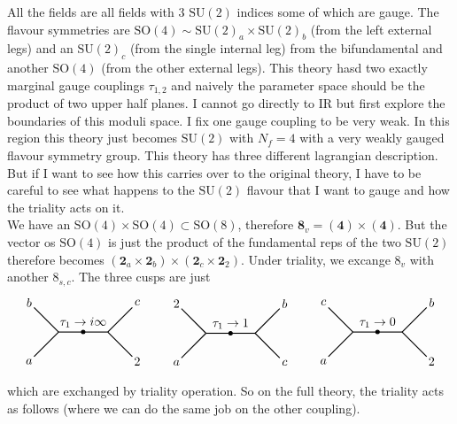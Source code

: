 \documentclass[11pt]{article}
\theoremstyle{definition}
\numberwithin{equation}{section}
\newcommand*\SU{\mathrm{SU}}
\newcommand*\SO{\mathrm{SO}}
\begin{document}
All the fields are all fields with $3$ $\SU(2)$ indices some of which are gauge. The flavour symmetries are $\SO(4)\sim\SU(2)_{a}\times\SU(2)_{b}$ (from the left external legs) and an $\SU(2)_{c}$ (from the single internal leg) from the bifundamental and another $\SO(4)$ (from the other external legs). This theory hasd two exactly marginal gauge couplings $\tau_{1,2}$ and naively the parameter space should be the product of two upper half planes. I cannot go directly to IR but first explore the boundaries of this moduli space. I fix one gauge coupling to be very weak. In this region this theory just becomes $\SU(2)$ with $N_{f}=4$ with a very weakly gauged flavour symmetry group. This theory has three different lagrangian description. But if I want to see how this carries over to the original theory, I have to be careful to see what happens to the $\SU(2)$ flavour that I want to gauge and how the triality acts on it.\\
We have an $\SO(4)\times\SO(4)\subset\SO(8)$, therefore $\mathbf{8}_{v}=(\mathbf{4})\times(\mathbf{4})$. But the vector os $\SO(4)$ is just the product of the fundamental reps of the two $\SU(2)$ therefore becomes $(\mathbf{2}_{a}\times \mathbf{2}_{b})\times(\mathbf{2}_{c}\times \mathbf{2}_{2})$. Under triality, we excange $8_{v}$ with another $8_{s,c}$. The three cusps are just
\begin{equation}
\begin{tikzpicture}[thick,scale=0.7]
  \node at (-.2,.2) {$b$};
  \node at (-.2,-2.2) {$a$};
  \node at (4.2,.2) {$c$};
  \node at (4.2,-2.2) {$2$};
  \draw[-](0,0)--(1,-1);
  \draw[-](1,-1)--(0,-2);
  \draw[-](1,-1)--(2,-1);
  \draw[-](2,-1)--(3,-1);
  \draw[-](3,-1)--(4,0);
  \draw[-](3,-1)--(4,-2);
  \filldraw[black] (2,-1) circle (2pt) node[above]{$\tau_{1}\rightarrow i \infty$};
\end{tikzpicture}\qquad\begin{tikzpicture}[thick,scale=0.7]
  \node at (-.2,.2) {$2$};
  \node at (-.2,-2.2) {$a$};
  \node at (4.2,.2) {$b$};
  \node at (4.2,-2.2) {$c$};
  \draw[-](0,0)--(1,-1);
  \draw[-](1,-1)--(0,-2);
  \draw[-](1,-1)--(2,-1);
  \draw[-](2,-1)--(3,-1);
  \draw[-](3,-1)--(4,0);
  \draw[-](3,-1)--(4,-2);
  \filldraw[black] (2,-1) circle (2pt) node[above]{$\tau_{1}\rightarrow 1$};
\end{tikzpicture}\qquad\begin{tikzpicture}[thick,scale=0.7]
  \node at (-.2,.2) {$c$};
  \node at (-.2,-2.2) {$a$};
  \node at (4.2,.2) {$b$};
  \node at (4.2,-2.2) {$2$};
  \draw[-](0,0)--(1,-1);
  \draw[-](1,-1)--(0,-2);
  \draw[-](1,-1)--(2,-1);
  \draw[-](2,-1)--(3,-1);
  \draw[-](3,-1)--(4,0);
  \draw[-](3,-1)--(4,-2);
  \filldraw[black] (2,-1) circle (2pt) node[above]{$\tau_{1}\rightarrow 0$};
\end{tikzpicture}
\end{equation}
which are exchanged by triality operation. So on the full theory, the triality acts as follows (where we can do the same job on the other coupling).
\end{document}
